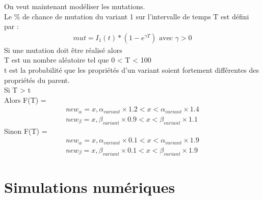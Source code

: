 \documentclass{article}
\begin{document}
\noindent
On veut maintenant modéliser les mutations.\\
Le \% de chance de mutation du variant 1 sur l'intervalle de temps T est défini par :
\begin{align}
    mut = I_1(t)*(1-e^{\gamma T})\text{ avec }\gamma > \text{0}
\end{align}
\noindent
Si une mutation doit être réalisé alors \\
\noindent
T est un nombre aléatoire tel que 0 < T < 100 \\
t est la probabilité que les propriétés d'un variant soient fortement différentes des propriétés du parent.\\
Si T > t \\
Alors F(T) = 
\begin{align}
    new_\alpha = x, \alpha_{variant} \times 1.2 < x < \alpha_{variant} \times 1.4 \\
    new_\beta = x, \beta_{variant} \times 0.9 < x < \beta_{variant} \times 1.1
\end{align}
\noindent
Sinon F(T) = \\
\begin{align}
    new_\alpha= x, \alpha_{variant} \times 0.1 < x < \alpha_{variant} \times 1.9 \\
    new_\beta= x, \beta_{variant} \times 0.1 < x < \beta_{variant} \times 1.9
\end{align}


\section{Simulations numériques}
\end{document}
